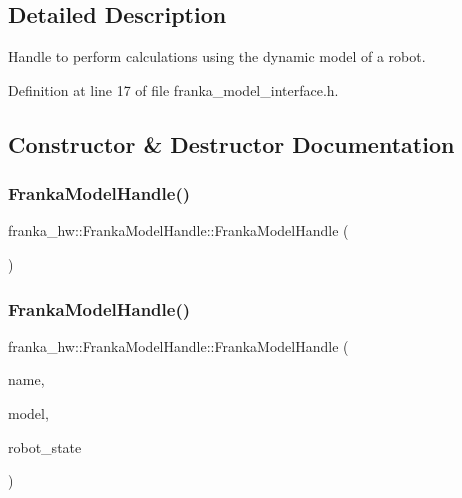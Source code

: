 \subsection{Detailed Description}
Handle to perform calculations using the dynamic model of a robot. 

Definition at line 17 of file franka\+\_\+model\+\_\+interface.\+h.



\subsection{Constructor \& Destructor Documentation}
\mbox{\label{classfranka__hw_1_1FrankaModelHandle_ac334b1156574e6a4b1d4128cc23af6af}} 
\subsubsection{\texorpdfstring{Franka\+Model\+Handle()}{FrankaModelHandle()}\hspace{0.1cm}{\footnotesize\ttfamily [1/2]}}
{\footnotesize\ttfamily franka\+\_\+hw\+::\+Franka\+Model\+Handle\+::\+Franka\+Model\+Handle (\begin{DoxyParamCaption}{ }\end{DoxyParamCaption})\hspace{0.3cm}{\ttfamily [delete]}}

\mbox{\label{classfranka__hw_1_1FrankaModelHandle_a814fbbc91e975d22ebd6e156e52944bd}} 
\subsubsection{\texorpdfstring{Franka\+Model\+Handle()}{FrankaModelHandle()}\hspace{0.1cm}{\footnotesize\ttfamily [2/2]}}
{\footnotesize\ttfamily franka\+\_\+hw\+::\+Franka\+Model\+Handle\+::\+Franka\+Model\+Handle (\begin{DoxyParamCaption}\item[{const std\+::string \&}]{name,  }\item[{\hyperlink{classfranka_1_1Model}{franka\+::\+Model} \&}]{model,  }\item[{\hyperlink{structfranka_1_1RobotState}{franka\+::\+Robot\+State} \&}]{robot\+\_\+state }\end{DoxyParamCaption})\hspace{0.3cm}{\ttfamily [inline]}}

